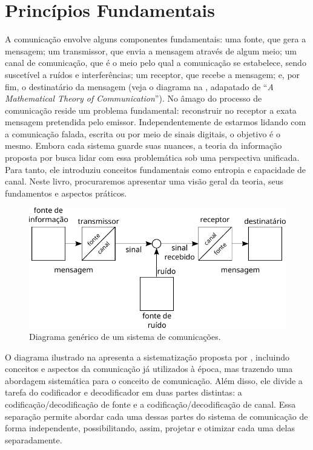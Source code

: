 \chapter{Princípios Fundamentais}

A comunicação envolve alguns componentes fundamentais: uma fonte, que gera a
mensagem; um transmissor, que envia a mensagem através de algum meio; um canal
de comunicação, que é o meio pelo qual a comunicação se estabelece, sendo
suscetível a ruídos e interferências; um receptor, que recebe a mensagem; e,
por fim, o destinatário da mensagem (veja o diagrama na
, adapatado de ``\emph{A Mathematical
Theory of Communication}''\cite{shannon1948}). No âmago do processo de
comunicação reside um problema fundamental: reconstruir no receptor a exata
mensagem pretendida pelo emissor. Independentemente de estarmos lidando com a
comunicação falada, escrita ou por meio de sinais digitais, o objetivo é o
mesmo. Embora cada sistema guarde suas nuances, a teoria da informação proposta
por \textcite{shannon1948} busca lidar com essa problemática sob uma perspectiva
unificada. Para tanto, ele introduziu conceitos fundamentais como entropia e
capacidade de canal. Neste livro, procuraremos apresentar uma visão geral da
teoria, seus fundamentos e aspectos práticos.

\begin{figure}
  \includegraphics[width=\linewidth]{figures/shannon-communication-system.pdf}
  \caption{Diagrama genérico de um sistema de comunicações.}
  \label{fig:shannon-communication-system}
\end{figure}

O diagrama ilustrado na  apresenta a
sistematização proposta por \textcite{shannon1948}, incluindo conceitos e aspectos
da comunicação já utilizados à época, mas trazendo uma abordagem sistemática
para o conceito de comunicação. Além disso, ele divide a tarefa do codificador
e decodificador em duas partes distintas: a codificação/decodificação de fonte
e a codificação/decodificação de canal. Essa separação permite abordar cada uma
dessas partes do sistema de comunicação de forma independente, possibilitando,
assim, projetar e otimizar cada uma delas separadamente.

